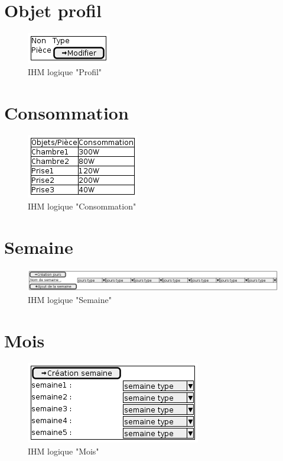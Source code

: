 \documentclass[10pt,a4paper]{report}
\begin{document}
		\section{Objet profil}

\begin{figure}[H]
	\centering
	\includegraphics[scale=0.55]{Objet_profil}
	\caption{IHM logique "Profil"}
	\label{ihmLogiqueProfil}
\end{figure}

		\section{Consommation}

\begin{figure}[H]
	\centering
	\includegraphics[scale=0.55]{Consommation}
	\caption{IHM logique "Consommation"}
	\label{ihmLogiqueConso}
\end{figure}

		\section{Semaine}

\begin{figure}[H]
	\centering
	\includegraphics[scale=0.55]{Semaine}
	\caption{IHM logique "Semaine"}
	\label{ihmLogiqueSemaine}
\end{figure}

		\section{Mois}

\begin{figure}[H]
	\centering
	\includegraphics[scale=0.55]{Mois}
	\caption{IHM logique "Mois"}
	\label{ihmLogiqueMois}
\end{figure}
\end{document}
